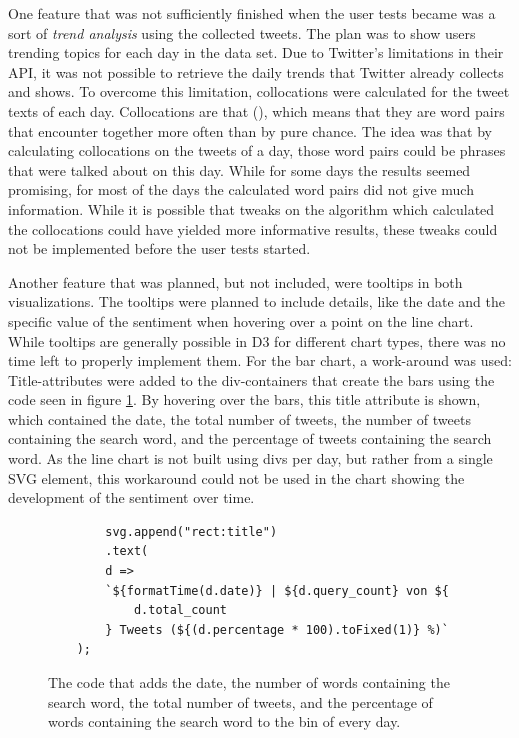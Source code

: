 One feature that was not sufficiently finished when the user tests became was a sort of \emph{trend analysis} using the collected tweets. The plan was to show users trending topics for each day in the data set. Due to Twitter's limitations in their API, it was not possible to retrieve the daily trends that Twitter already collects and shows. 
To overcome this limitation, collocations were calculated for the tweet texts of each day. Collocations are  that  (\cite[2]{mckeown2000collocations}), which means that they are word pairs that encounter together more often than by pure chance. The idea was that by calculating collocations on the tweets of a day, those word pairs could be phrases that were talked about on this day. While for some days the results seemed promising, for most of the days the calculated word pairs did not give much information. While it is possible that tweaks on the algorithm which calculated the collocations could have yielded more informative results, these tweaks could not be implemented before the user tests started.

Another feature that was planned, but not included, were tooltips in both visualizations. The tooltips were planned to include details, like the date and the specific value of the sentiment when hovering over a point on the line chart. While tooltips are generally possible in D3 for different chart types, there was no time left to properly implement them. For the bar chart, a work-around was used: Title-attributes were added to the div-containers that create the bars using the code seen in figure \ref{fig:sentiment_linechart}. By hovering over the bars, this title attribute is shown, which contained the date, the total number of tweets, the number of tweets containing the search word, and the percentage of tweets containing the search word. As the line chart is not built using divs per day, but rather from a single SVG element, this workaround could not be used in the chart showing the development of the sentiment over time.

\begin{figure}[h!]
    \begin{verbatim}
        svg.append("rect:title")
        .text(
        d =>
        `${formatTime(d.date)} | ${d.query_count} von ${
            d.total_count
        } Tweets (${(d.percentage * 100).toFixed(1)} %)`
    );
    \end{verbatim}
    \caption{The code that adds the date, the number of words containing the search word, the total number of tweets, and the percentage of words containing the search word to the bin of every day.}
    \label{fig:sentiment_linechart}
\end{figure}

